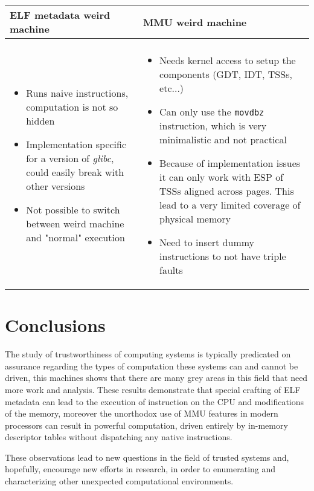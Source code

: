 \documentclass[11pt,twoside,a4paper]{article}
\begin{document}
\begin{longtable}{ p{} | p{} }
\bfseries{ELF metadata weird machine} & \bfseries{MMU weird machine} \\ \hline \\
\begin{itemize}
\item Runs naive instructions, computation is not so hidden
\item Implementation specific for a version of \emph{glibc}, could easily break with other versions
\item Not possible to switch between weird machine and "normal" execution
\end{itemize}
&
\begin{itemize}
\item Needs kernel access to setup the components (GDT, IDT, TSSs, etc...)
\item Can only use the \texttt{movdbz} instruction, which is very minimalistic and not practical
\item Because of implementation issues it can only work with ESP of TSSs aligned across pages. This lead to a very limited coverage of physical memory
\item Need to insert dummy instructions to not have triple faults 
\end{itemize} \\

\end{longtable}


\section{Conclusions}

The study of trustworthiness of computing systems is typically predicated on assurance regarding the types of computation these systems can and cannot be driven, this machines shows that there are many grey areas in this field that need more work and analysis.
These results demonstrate that special crafting of ELF metadata can lead to the execution of instruction on the CPU and modifications of the memory, moreover the unorthodox use of MMU features in modern processors can result in powerful computation, driven entirely by in-memory descriptor tables without dispatching any native instructions.

These observations lead to new questions in the field of trusted systems and, hopefully, encourage new efforts in research, in order to enumerating and characterizing other unexpected computational environments.
\end{document}

